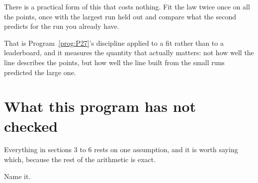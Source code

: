 \begin{fr}
\begin{aibox}
There is a practical form of this that costs nothing. Fit the law twice
\dash{} once on all the points, once with the largest run held out \dash{}
and compare what the second predicts for the run you already have.

That is Program~\ref{prog:P27}'s discipline applied to a fit rather than to a
leaderboard, and it measures the quantity that actually matters: not how
well the line describes the points, but how well the line built from the
small runs predicted the large one.
\end{aibox}
\end{fr}

\section{What this program has not checked}
\label{sec:P33-unchecked}

\begin{fr}
Everything in sections 3 to 6 rests on one assumption, and it is worth
saying which, because the rest of the arithmetic is exact.

Name it.
\dotline
\nextframe
\end{fr}

